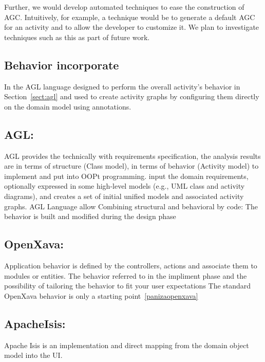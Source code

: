Further, we would develop automated techniques to ease the construction of AGC. Intuitively, for example, a technique would be to generate a default AGC for an activity and to allow the developer to customize it. We plan to investigate techniques such as this as part of future work.
%
\subsection{Behavior incorporate} \label{sect:eval-behavior-incorporate}
%
%
In the AGL language designed to perform the overall activity’s behavior in Section~\ref{sect:agl} and used to create activity graphs by configuring them directly on the domain model using annotations.
\subsection*{AGL:}
AGL provides the technically with requirements specification, the analysis results are in terms of structure (Class model), in terms of behavior (Activity model) to implement and put into OOPt programming.
input the domain requirements, optionally expressed in some high-level models (e.g., UML class and activity diagrams), and creates a set of initial unified models and associated activity graphs.
AGL  Language allow  Combining structural and behavioral by code:
The behavior is built and modified during the design phase
\subsection*{OpenXava:}
Application behavior is defined by the controllers, actions and associate them to modules or entities. The behavior referred to in the impliment phase and the possibility of tailoring the behavior to fit your user expectations
The standard OpenXava behavior is only a starting point~\ref{panizaopenxava}
\subsection*{ApacheIsis:}
Apache Isis is an implementation and direct mapping from the domain object model into the UI.

